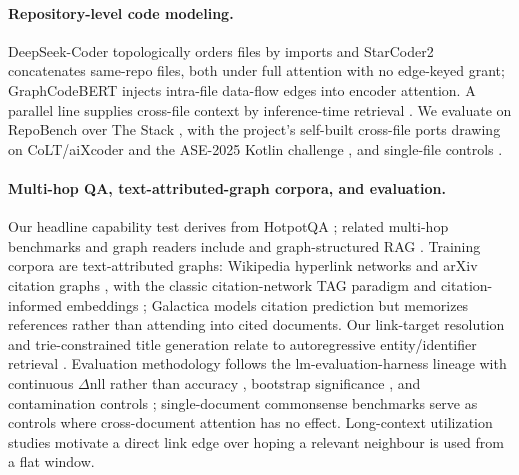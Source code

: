 \paragraph{Repository-level code modeling.}
DeepSeek-Coder \citep{guo2024deepseekcoder,zhu2024deepseekcoderv2} topologically orders
files by imports and StarCoder2 \citep{lozhkov2024starcoder2} concatenates same-repo
files, both under full attention with no edge-keyed grant; GraphCodeBERT
\citep{guo2021graphcodebert} injects intra-file data-flow edges into encoder attention.
A parallel line supplies cross-file context by inference-time retrieval
\citep{zhang2023repocoder,ding2023crosscodeeval,lu2022reacc,cheng2024draco,wu2024repoformer,ouyang2024repograph}.
We evaluate on RepoBench \citep{liu2024repobench} over The Stack
\citep{kocetkov2022stack}, with the project's self-built cross-file ports drawing on
CoLT/aiXcoder \citep{li2025aixcoder} and the ASE-2025 Kotlin challenge
\citep{ustalov2025contextcollection}, and single-file controls
\citep{chen2021humaneval,austin2021mbpp,muennighoff2024octopack}.

\paragraph{Multi-hop QA, text-attributed-graph corpora, and evaluation.}
Our headline capability test derives from HotpotQA \citep{yang2018hotpotqa}; related
multi-hop benchmarks and graph readers include
\citet{welbl2018wikihop,ho2020twowiki,trivedi2022musique,ding2019cognitivegraph,decao2019entitygcn}
and graph-structured RAG \citep{edge2024graphrag,gutierrez2024hipporag}. Training
corpora are text-attributed graphs: Wikipedia hyperlink networks
\citep{consonni2019wikilinkgraphs,petroni2021kilt} and arXiv citation graphs
\citep{saier2020unarxive,saier2023unarxive,lo2020s2orc,hu2020ogb}, with the classic
citation-network TAG paradigm \citep{sen2008collective} and citation-informed
embeddings \citep{cohan2020specter,ostendorff2022scincl}; Galactica
\citep{taylor2022galactica} models citation prediction but memorizes references rather
than attending into cited documents. Our link-target resolution and trie-constrained
title generation relate to autoregressive entity/identifier retrieval
\citep{decao2021genre,bevilacqua2022seal,tay2022dsi}. Evaluation methodology follows the
lm-evaluation-harness lineage \citep{gao2021lmeval,biderman2024lessons} with continuous
$\Delta$nll rather than accuracy \citep{schaeffer2023mirage}, bootstrap significance
\citep{koehn2004statsig}, and contamination controls
\citep{sainz2023contamination,oren2024contamination}; single-document commonsense
benchmarks \citep{zellers2019hellaswag,clark2018arc,bisk2020piqa} serve as controls
where cross-document attention has no effect. Long-context utilization studies
\citep{liu2024lostmiddle,hsieh2024ruler,vodrahalli2024michelangelo,xu2024retrievalmeetslong}
motivate a direct link edge over hoping a relevant neighbour is used from a flat window.
